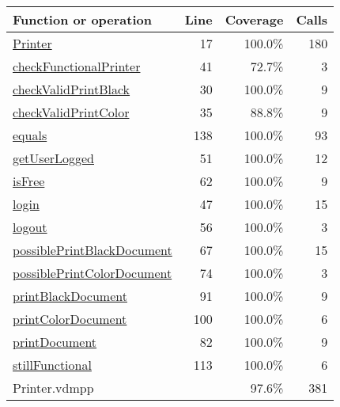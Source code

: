 \begin{longtable}{|l|r|r|r|}
\hline
Function or operation & Line & Coverage & Calls \\
\hline
\hline
\hyperref[Printer:17]{Printer} & 17&100.0\% & 180 \\
\hline
\hyperref[checkFunctionalPrinter:41]{checkFunctionalPrinter} & 41&72.7\% & 3 \\
\hline
\hyperref[checkValidPrintBlack:30]{checkValidPrintBlack} & 30&100.0\% & 9 \\
\hline
\hyperref[checkValidPrintColor:35]{checkValidPrintColor} & 35&88.8\% & 9 \\
\hline
\hyperref[equals:138]{equals} & 138&100.0\% & 93 \\
\hline
\hyperref[getUserLogged:51]{getUserLogged} & 51&100.0\% & 12 \\
\hline
\hyperref[isFree:62]{isFree} & 62&100.0\% & 9 \\
\hline
\hyperref[login:47]{login} & 47&100.0\% & 15 \\
\hline
\hyperref[logout:56]{logout} & 56&100.0\% & 3 \\
\hline
\hyperref[possiblePrintBlackDocument:67]{possiblePrintBlackDocument} & 67&100.0\% & 15 \\
\hline
\hyperref[possiblePrintColorDocument:74]{possiblePrintColorDocument} & 74&100.0\% & 3 \\
\hline
\hyperref[printBlackDocument:91]{printBlackDocument} & 91&100.0\% & 9 \\
\hline
\hyperref[printColorDocument:100]{printColorDocument} & 100&100.0\% & 6 \\
\hline
\hyperref[printDocument:82]{printDocument} & 82&100.0\% & 9 \\
\hline
\hyperref[stillFunctional:113]{stillFunctional} & 113&100.0\% & 6 \\
\hline
\hline
Printer.vdmpp & & 97.6\% & 381 \\
\hline
\end{longtable}

